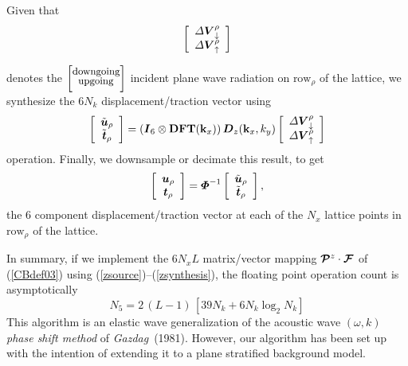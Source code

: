 \begin{samepage}
Given that
\[
\left[\begin{array}{c}
{\mit \Delta} {\mbox{\boldmath$\mit V$\unboldmath}}_{\downarrow }^{  \rho}\\
{\mit \Delta} {\mbox{\boldmath$\mit V$\unboldmath}}_{\uparrow }^{  \rho}
\end{array}  \right]
\]
\end{samepage}
denotes the $\left[{\stackrel{\mbox{\small downgoing}}{{}_{\mbox{\small 
upgoing}}}}\right]$
incident plane wave radiation on $\mbox{row}_{\rho}$ of the lattice, we 
synthesize the  $6 N_k$ displacement/traction vector using
\begin{equation} \label{zsynthesis}
\left[\begin{array}{c}
\tilde{\mbox{\boldmath$\mit u$\unboldmath}}_{  \rho}\\
\tilde{\mbox{\boldmath$\mit t$\unboldmath}}_{  \rho}
\end{array}  \right]
=
\left({\mbox{\boldmath$\mit I$\unboldmath}}_6\otimes 
{\bf DFT}({\bf k}_{x}) \right){\mbox{\boldmath$\mit D$\unboldmath}}_{z}({\bf k}_{x},{k}_{y})
\left[\begin{array}{c}
{\mit \Delta} {\mbox{\boldmath$\mit V$\unboldmath}}_{\downarrow }^{  \rho}\\
{\mit \Delta} {\mbox{\boldmath$\mit V$\unboldmath}}_{\uparrow }^{  \rho}
\end{array}\right]
\end{equation}
operation. Finally, we downsample or decimate this result, to get
\[
\left[\begin{array}{c}
{\mbox{\boldmath$\mit u$\unboldmath}}_{  \rho}\\
{\mbox{\boldmath$\mit t$\unboldmath}}_{  \rho}
\end{array}  \right]=
{\mbox{\boldmath$\mit \Phi$\unboldmath}}^{-1}\left[\begin{array}{c}
\tilde{\mbox{\boldmath$\mit u$\unboldmath}}_{  \rho}\\
\tilde{\mbox{\boldmath$\mit t$\unboldmath}}_{  \rho}
\end{array}  \right],
\]
the $6$ component displacement/traction vector  at each of the $N_x$ 
lattice points in $\mbox{row}_{\rho}$ of the lattice.

In summary, if we implement the $6 N_x L$ matrix/vector mapping
${\mbox{\boldmath$\cal P$\unboldmath}}{}^{z}\cdot {\mbox{\boldmath$\cal F$\unboldmath}}$ of (\ref{CBdef03}) using 
(\ref{zsource})--(\ref{zsynthesis}), the floating point operation count 
is asymptotically
\begin{equation} \label{N5def}
N_5=2\,(L-1)\,\left[ 39 N_k + 6 N_k \log_2 N_k \right]
\end{equation}
This algorithm is an elastic wave generalization of the acoustic wave $(\omega, k)$ {\em phase shift 
method\/} of {\em Gazdag\/}~(1981). However, our algorithm has been set 
up with the intention of extending it to a plane stratified background 
model.


